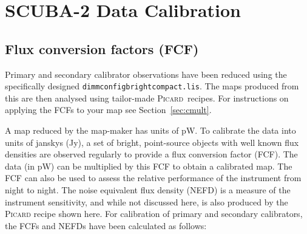 \documentclass[twoside,11pt]{article}
\newcommand{\htmlref}[2]{#1}
\newcommand{\latexhtml}[2]{#1}
\newcommand{\xref}[3]{#1}
\newcommand{\xlabel}[1]{}
\renewcommand{\_}{\texttt{\symbol{95}}}
\newcommand{\picard}{\xref{\textsc{Picard}}{sun265}{}}
\newcommand{\cref}[3]{\latexhtml{#1~\ref{#2}}{\htmlref{#3}{#2}}}
\begin{document}
\clearpage
\section{\xlabel{calib}SCUBA-2 Data Calibration}
\label{sec:cal}

\subsection{\xlabel{fcf}Flux conversion factors (FCF)}
\label{sec:fcf}

Primary and secondary calibrator observations have been reduced using
the specifically designed \texttt{dimmconfig\_bright\_compact.lis}.
The maps produced from this are then analysed using tailor-made
\picard\ recipes. For instructions on applying the FCFs to your map see
\cref{Section}{sec:cmult}{this page}.

A map reduced by the map-maker has units of pW. To calibrate the data
into units of janskys (Jy), a set of bright, point-source objects with
well known flux densities are observed regularly to provide a flux
conversion factor (FCF). The data (in pW) can be multiplied by this FCF
to obtain a calibrated map. The FCF can also be used to assess the
relative performance of the instrument from night to night. The noise
equivalent flux density (NEFD) is a measure of the instrument
sensitivity, and while not discussed here, is also produced by the
\textsc{Picard} recipe shown here. For calibration of primary and secondary
calibrators, the FCFs and NEFDs have been calculated as follows:
\end{document}
